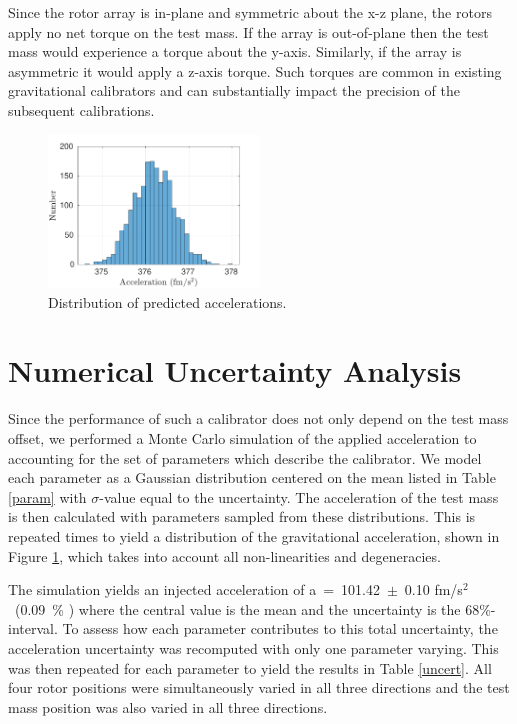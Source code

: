\documentclass[superscriptaddress, twocolumn, prd]{revtex4-1}
\begin{document}
Since the rotor array is in-plane and symmetric about the x-z plane, the rotors apply no net torque on the test mass. If the array is out-of-plane then the test mass would experience a torque about the y-axis. Similarly, if the array is asymmetric it would apply a z-axis torque. Such torques are common in existing gravitational calibrators and can substantially impact the precision of the subsequent calibrations.

\begin{figure}[!h]
\centering \includegraphics[width=0.5\textwidth]{Super4_Dist.pdf}
\caption{Distribution of predicted accelerations.}
\label{dist} 
\end{figure}

\section{Numerical Uncertainty Analysis}

Since the performance of such a calibrator does not only depend on the test mass offset, we performed a Monte Carlo simulation of the applied acceleration to accounting for the set of parameters which describe the calibrator. We model each parameter as a Gaussian distribution centered on the mean listed in Table \ref{param} with $\sigma$-value equal to the uncertainty. The acceleration of the test mass is then calculated with parameters sampled from these distributions. This is repeated  times to yield a distribution of the gravitational acceleration, shown in Figure \ref{dist}, which takes into account all non-linearities and degeneracies. 


The simulation yields an injected acceleration of a~=~101.42~$\pm$~0.10 fm/s$^2$~(0.09~\% ) where the central value is the mean and the uncertainty is the 68\%-interval. To assess how each parameter contributes to this total uncertainty, the acceleration uncertainty was recomputed with only one parameter varying. This was then repeated for each parameter to yield the results in Table \ref{uncert}. All four rotor positions were simultaneously varied  in all three directions and the test mass position was also varied in all three directions.
\end{document}
